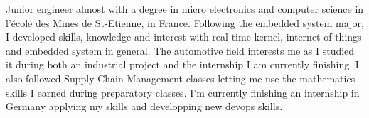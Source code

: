 %
%
%
\par{
Junior engineer almost with a degree in micro electronics and computer science in l'école des Mines de St-Etienne, in France. Following the embedded system major, I developed skills, knowledge and interest with real time kernel, internet of things and embedded system in general. The automotive field interests me as I studied it during both an industrial project and the internship I am currently finishing. I also followed Supply Chain Management classes letting me use the mathematics skills I earned during preparatory classes. I'm currently finishing an internship in Germany applying my skills and developping new devops skills.
}